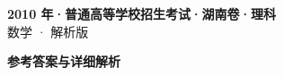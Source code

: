 \documentclass[zihao=-4, a4paper]{ctexart}
\begin{document}
\begin{center}
  {\Large\bfseries 2010 年·普通高等学校招生考试·湖南卷·理科}\\[4pt]
  {\large 数学 · 解析版}
\end{center}
\medskip
{}

\clearpage
{}
\begin{center}{\Large\bfseries 参考答案与详细解析}\end{center}
\medskip

\end{document}
